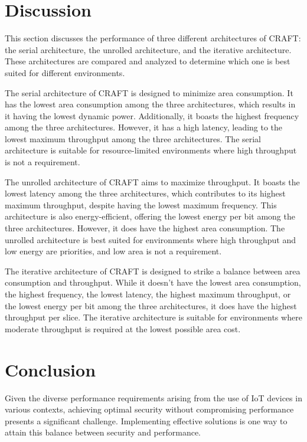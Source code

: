 \documentclass[final,5p,times,twocolumn]{elsarticle}
\begin{document}
\section{Discussion}\label{discussion_sec}

This section discusses the performance of three different architectures of CRAFT: the serial architecture, the unrolled architecture, and the iterative architecture. These architectures are compared and analyzed to determine which one is best suited for different environments.

The serial architecture of CRAFT is designed to minimize area consumption. It has the lowest area consumption among the three architectures, which results in it having the lowest dynamic power. Additionally, it boasts the highest frequency among the three architectures. However, it has a high latency, leading to the lowest maximum throughput among the three architectures. The serial architecture is suitable for resource-limited environments where high throughput is not a requirement.

The unrolled architecture of CRAFT aims to maximize throughput. It boasts the lowest latency among the three architectures, which contributes to its highest maximum throughput, despite having the lowest maximum frequency. This architecture is also energy-efficient, offering the lowest energy per bit among the three architectures. However, it does have the highest area consumption. The unrolled architecture is best suited for environments where high throughput and low energy are priorities, and low area is not a requirement.

The iterative architecture of CRAFT is designed to strike a balance between area consumption and throughput. While it doesn't have the lowest area consumption, the highest frequency, the lowest latency, the highest maximum throughput, or the lowest energy per bit among the three architectures, it does have the highest throughput per slice. The iterative architecture is suitable for environments where moderate throughput is required at the lowest possible area cost.


\section{Conclusion}\label{sec6}

Given the diverse performance requirements arising from the use of IoT devices in various contexts, achieving optimal security without compromising performance presents a significant challenge. Implementing effective solutions is one way to attain this balance between security and performance.
\end{document}
